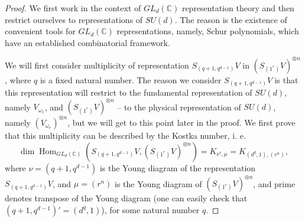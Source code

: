 \documentclass[11pt,letterpaper]{article}
\theoremstyle{plain}
\theoremstyle{plain}
\theoremstyle{plain}
\theoremstyle{plain}
\theoremstyle{plain}
\theoremstyle{plain}
\theoremstyle{plain}
\theoremstyle{definition}
\theoremstyle{plain}
\begin{document}
\begin{proof}
    We first work in the context of $GL_d(\mathbb{C})$ representation theory and then 
    restrict ourselves to representations of $SU(d)$. The reason is the existence of
    convenient tools for $GL_d(\mathbb{C})$ representations, namely, Schur polynomials, which have an established combinatorial framework. 
    
    We will first consider multiplicity of representation $S_{\left(q+1, q^{d-1}\right)} V$ in $\left(S_{\left(1^r\right)}V\right)^{\otimes n}$, where $q$ is a fixed natural number. 
    The reason we consider $S_{\left(q+1, q^{d-1}\right)} V$ is that this representation will restrict to the fundamental representation of $SU(d)$, namely $V_{\omega_1}$, and $\left(S_{\left(1^r\right)}V\right)^{\otimes n}$ -- to the physical representation of $SU(d)$, namely $(V_{\omega_r})^{\otimes n}$, but we 
    will get to this point later in the proof. We first prove that this multiplicity can be described by the Kostka number, i. e.
    \begin{equation}\label{eq:KostkaMultiplicity}
        \operatorname{dim} \operatorname{Hom}_{GL_d(\mathbb{C})}\left(S_{\left(q+1, q^{d-1}\right)} V,\left(S_{\left(1^r\right)}V\right)^{\otimes n}\right)=K_{\nu', \mu}=K_{\left(d^q, 1\right),\left(r^n\right)},
    \end{equation}
    where $\nu=\left(q+1, q^{d-1}\right)$ is the Young diagram of the representation $S_{\left(q+1, q^{d-1}\right)} V$, and $\mu=\left(r^n\right)$ is the Young diagram of $\left(S_{\left(1^r\right)}V\right)^{\otimes n}$, and prime
    denotes transpose of the Young diagram (one can easily check that $\left(q+1, q^{d-1}\right)' = \left(d^q, 1\right)$), for some natural number $q$.


\end{proof}
\end{document}
